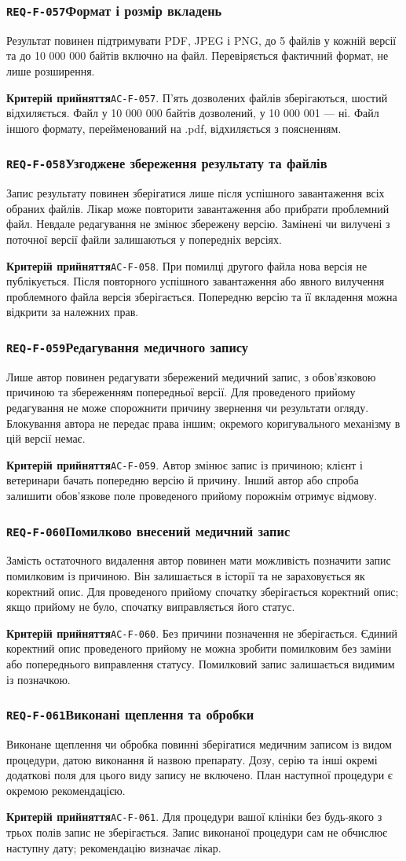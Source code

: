 \documentclass[11pt,a4paper]{article}
\newcommand{\requirement}[4]{%
  \Needspace{7\baselineskip}%
  \subsubsection*{\hypertarget{#1}{\texttt{#1}}\quad #2}%
  #3\par
  \textbf{Критерій прийняття}\quad #4\par\medskip}
\begin{document}
\requirement{REQ-F-057}{Формат і розмір вкладень}{Результат повинен підтримувати PDF, JPEG і PNG, до 5 файлів у кожній версії та до 10 000 000 байтів включно на файл. Перевіряється фактичний формат, не лише розширення.}{\hypertarget{AC-F-057}{\texttt{AC-F-057}}. П’ять дозволених файлів зберігаються, шостий відхиляється. Файл у 10 000 000 байтів дозволений, у 10 000 001 — ні. Файл іншого формату, перейменований на .pdf, відхиляється з поясненням.}

\requirement{REQ-F-058}{Узгоджене збереження результату та файлів}{Запис результату повинен зберігатися лише після успішного завантаження всіх обраних файлів. Лікар може повторити завантаження або прибрати проблемний файл. Невдале редагування не змінює збережену версію. Замінені чи вилучені з поточної версії файли залишаються у попередніх версіях.}{\hypertarget{AC-F-058}{\texttt{AC-F-058}}. При помилці другого файла нова версія не публікується. Після повторного успішного завантаження або явного вилучення проблемного файла версія зберігається. Попередню версію та її вкладення можна відкрити за належних прав.}

\requirement{REQ-F-059}{Редагування медичного запису}{Лише автор повинен редагувати збережений медичний запис, з обов’язковою причиною та збереженням попередньої версії. Для проведеного прийому редагування не може спорожнити причину звернення чи результати огляду. Блокування автора не передає права іншим; окремого коригувального механізму в цій версії немає.}{\hypertarget{AC-F-059}{\texttt{AC-F-059}}. Автор змінює запис із причиною; клієнт і ветеринари бачать попередню версію й причину. Інший автор або спроба залишити обов’язкове поле проведеного прийому порожнім отримує відмову.}

\requirement{REQ-F-060}{Помилково внесений медичний запис}{Замість остаточного видалення автор повинен мати можливість позначити запис помилковим із причиною. Він залишається в історії та не зараховується як коректний опис. Для проведеного прийому спочатку зберігається коректний опис; якщо прийому не було, спочатку виправляється його статус.}{\hypertarget{AC-F-060}{\texttt{AC-F-060}}. Без причини позначення не зберігається. Єдиний коректний опис проведеного прийому не можна зробити помилковим без заміни або попереднього виправлення статусу. Помилковий запис залишається видимим із позначкою.}

\requirement{REQ-F-061}{Виконані щеплення та обробки}{Виконане щеплення чи обробка повинні зберігатися медичним записом із видом процедури, датою виконання й назвою препарату. Дозу, серію та інші окремі додаткові поля для цього виду запису не включено. План наступної процедури є окремою рекомендацією.}{\hypertarget{AC-F-061}{\texttt{AC-F-061}}. Для процедури вашої клініки без будь-якого з трьох полів запис не зберігається. Запис виконаної процедури сам не обчислює наступну дату; рекомендацію визначає лікар.}
\end{document}

